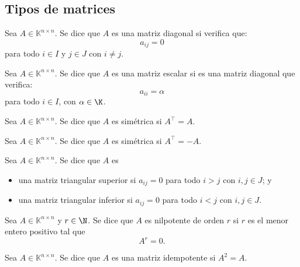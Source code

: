 \documentclass[a4,11pt]{aleph-notas}
\begin{document}
\subsection{Tipos de matrices}

\begin{defi}
    Sea $A\in \mathbb{K}^{n \times n}$. Se dice que $A$ es una matriz diagonal si verifica que:
    \[ 
        a_{ij} = 0
    \]
    para todo $i\in I$ y $j\in J$ con $i\neq j$.
\end{defi}

\begin{defi}
    Sea $A\in \mathbb{K}^{n \times n}$. Se dice que $A$ es una matriz escalar si es una matriz diagonal que verifica:
    \[ 
        a_{ii} = \alpha
    \]
    para todo $i\in I$, con $\alpha\in\K$.
\end{defi}

\begin{defi}
    Sea $A\in \mathbb{K}^{n \times n}$. Se dice que $A$ es simétrica si $A^\intercal = A$.
\end{defi}

\begin{defi}
    Sea $A\in \mathbb{K}^{n \times n}$. Se dice que $A$ es simétrica si $A^\intercal = -A$.
\end{defi}

\begin{defi}
    Sea $A\in \mathbb{K}^{n \times n}$. Se dice que $A$ es
    \begin{itemize}
    \item 
        una matriz triangular superior si $a_{ij} = 0 $ para todo $i>j$ con $i,j \in J$; y
    \item 
        una matriz triangular inferior si $a_{ij} = 0 $ para todo $i<j$ con $i,j \in J$.
    \end{itemize}
\end{defi}

\begin{defi}
    Sea $A\in \mathbb{K}^{n \times n}$ y $r \in \N$. Se dice que $A$ es nilpotente de orden $r$ si $r$ es el menor entero positivo tal que
    \[ 
        A^r = 0.
    \]
\end{defi}

\begin{defi}
    Sea $A\in \mathbb{K}^{n \times n}$. Se dice que $A$ es una matriz idempotente si $A^2 = A$.
\end{defi}
\end{document}
